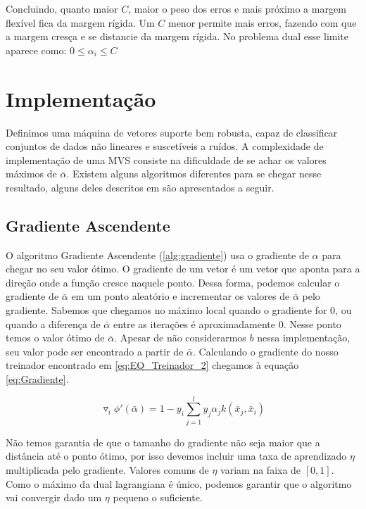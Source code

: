 Concluindo,  quanto maior $C$, maior o peso dos erros e mais próximo a margem flexível fica da margem rígida. Um $C$ menor permite mais erros, fazendo com que a margem cresça e se distancie da margem rígida. No problema dual esse limite aparece como: $0\le \alpha_i \le C$

\section{Implementação}
Definimos uma máquina de vetores suporte bem robusta, capaz de classificar conjuntos de dados não lineares e suscetíveis a ruídos. A complexidade de implementação de uma MVS consiste na dificuldade de se achar os valores máximos de $\bar{\alpha}$. Existem alguns algoritmos diferentes para se chegar nesse resultado, alguns deles descritos em \cite{art:LIVRO_SVM} são apresentados a seguir.

\subsection{Gradiente Ascendente}\label{sec:gradiente}
O algoritmo Gradiente Ascendente (\ref{alg:gradiente}) usa o gradiente de $\alpha$ para chegar no seu valor ótimo. O gradiente de um vetor é um vetor que aponta para a direção onde a função cresce naquele ponto. Dessa forma, podemos calcular o gradiente de $\bar{\alpha}$ em um ponto aleatório e incrementar os valores de $\bar{\alpha}$ pelo gradiente. Sabemos que chegamos no máximo local quando o gradiente for $0$, ou quando a diferença de $\bar{\alpha}$ entre as iterações é aproximadamente $0$. Nesse ponto temos o valor ótimo de $\bar{\alpha}$. Apesar de não considerarmos $b$ nessa implementação, seu valor pode ser encontrado a partir de $\bar{\alpha}$. Calculando o gradiente do nosso treinador encontrado em \ref{eq:EQ_Treinador_2} chegamos à equação \ref{eq:Gradiente}.

\begin{equation}
    \triangledown_i {\phi}'(\bar{\alpha}) = 1-y_i\sum_{j=1}^ly_j\alpha_jk(\bar{x}_j,\bar{x}_i)
    \label{eq:Gradiente}
\end{equation}

Não temos garantia de que o tamanho do gradiente não seja maior que a distância até o ponto ótimo, por isso devemos incluir uma taxa de aprendizado $\eta$ multiplicada pelo gradiente. Valores comuns de $\eta$ variam na faixa de $[0,1]$. Como o máximo da dual lagrangiana é único, podemos garantir que o algoritmo vai convergir dado um $\eta$ pequeno o suficiente.

